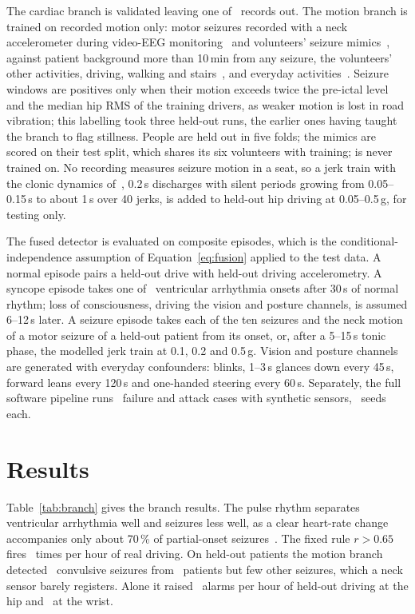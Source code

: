 \documentclass[conference]{IEEEtran}
\begin{document}
The cardiac branch is validated leaving one of \NcardRecords\ records out. The motion branch is trained on recorded motion only: motor seizures recorded with a neck accelerometer during video-EEG monitoring~\cite{bhagubai2025} and volunteers' seizure mimics~\cite{villar2016}, against patient background more than 10\,min from any seizure, the volunteers' other activities, driving, walking and stairs~\cite{karas2021}, and everyday activities~\cite{banos2014}. Seizure windows are positives only when their motion exceeds twice the pre-ictal level and the median hip RMS of the training drivers, as weaker motion is lost in road vibration; this labelling took three held-out runs, the earlier ones having taught the branch to flag stillness. People are held out in five folds; the mimics are scored on their test split, which shares its six volunteers with training; \cite{anguita2013} is never trained on. No recording measures seizure motion in a seat, so a jerk train with the clonic dynamics of~\cite{conradsen2013}, 0.2\,s discharges with silent periods growing from 0.05--0.15\,s to about 1\,s over 40 jerks, is added to held-out hip driving at 0.05--0.5\,g, for testing only.

The fused detector is evaluated on composite episodes, which is the conditional-independence assumption of Equation~\eqref{eq:fusion} applied to the test data. A normal episode pairs a held-out drive with held-out driving accelerometry. A syncope episode takes one of \NSyncopeEp\ ventricular arrhythmia onsets after 30\,s of normal rhythm; loss of consciousness, driving the vision and posture channels, is assumed 6--12\,s later. A seizure episode takes each of the ten seizures and the neck motion of a motor seizure of a held-out patient from its onset, or, after a 5--15\,s tonic phase, the modelled jerk train at 0.1, 0.2 and 0.5\,g. Vision and posture channels are generated with everyday confounders: blinks, 1--3\,s glances down every 45\,s, forward leans every 120\,s and one-handed steering every 60\,s. Separately, the full software pipeline runs \FaultCases\ failure and attack cases with synthetic sensors, \FaultSeeds\ seeds each.

\section{Results}
Table~\ref{tab:branch} gives the branch results. The pulse rhythm separates ventricular arrhythmia well and seizures less well, as a clear heart-rate change accompanies only about 70\,\% of partial-onset seizures~\cite{eggleston2014}. The fixed rule $r>0.65$ fires \BaseSerDriveFA\ times per hour of real driving. On held-out patients the motion branch detected \MrSzConv\ convulsive seizures from \MrSzConvPatients\ patients but few other seizures, which a neck sensor barely registers. Alone it raised \MrDriveHipFA\ alarms per hour of held-out driving at the hip and \MrDriveWristFA\ at the wrist.
\end{document}
